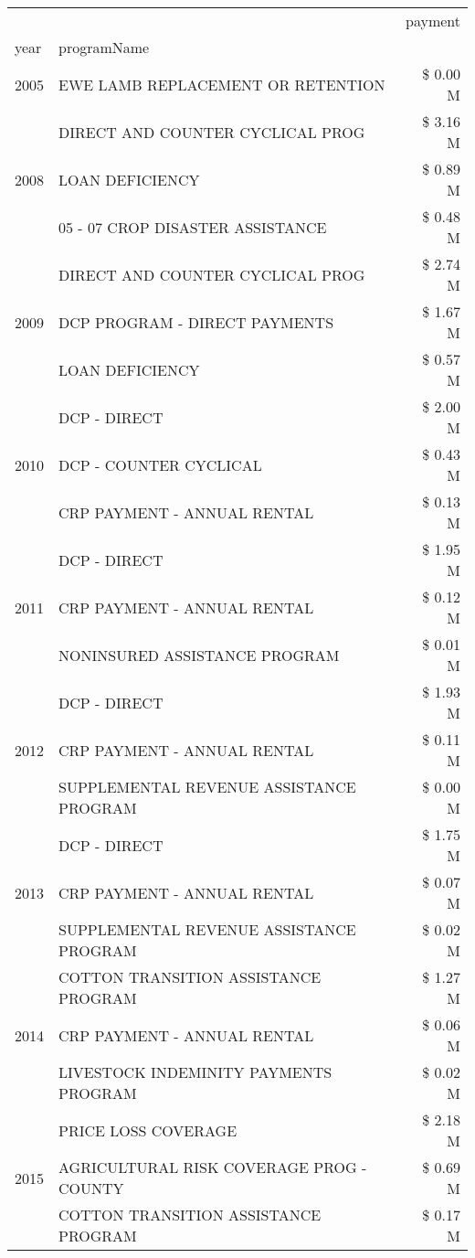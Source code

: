 \begin{tabular}{llr}
\toprule
 &  & payment \\
year & programName &  \\
\midrule
2005 & EWE LAMB REPLACEMENT OR RETENTION & \$ 0.00 M \\
\cline{1-3}
\multirow[t]{3}{*}{2008} & DIRECT AND COUNTER CYCLICAL PROG & \$ 3.16 M \\
 & LOAN DEFICIENCY & \$ 0.89 M \\
 & 05 - 07 CROP DISASTER ASSISTANCE & \$ 0.48 M \\
\cline{1-3}
\multirow[t]{3}{*}{2009} & DIRECT AND COUNTER CYCLICAL PROG & \$ 2.74 M \\
 & DCP PROGRAM - DIRECT PAYMENTS & \$ 1.67 M \\
 & LOAN DEFICIENCY & \$ 0.57 M \\
\cline{1-3}
\multirow[t]{3}{*}{2010} & DCP - DIRECT & \$ 2.00 M \\
 & DCP - COUNTER CYCLICAL & \$ 0.43 M \\
 & CRP PAYMENT - ANNUAL RENTAL & \$ 0.13 M \\
\cline{1-3}
\multirow[t]{3}{*}{2011} & DCP - DIRECT & \$ 1.95 M \\
 & CRP PAYMENT - ANNUAL RENTAL & \$ 0.12 M \\
 & NONINSURED ASSISTANCE PROGRAM & \$ 0.01 M \\
\cline{1-3}
\multirow[t]{3}{*}{2012} & DCP - DIRECT & \$ 1.93 M \\
 & CRP PAYMENT - ANNUAL RENTAL & \$ 0.11 M \\
 & SUPPLEMENTAL REVENUE ASSISTANCE PROGRAM & \$ 0.00 M \\
\cline{1-3}
\multirow[t]{3}{*}{2013} & DCP - DIRECT & \$ 1.75 M \\
 & CRP PAYMENT - ANNUAL RENTAL & \$ 0.07 M \\
 & SUPPLEMENTAL REVENUE ASSISTANCE PROGRAM & \$ 0.02 M \\
\cline{1-3}
\multirow[t]{3}{*}{2014} & COTTON TRANSITION ASSISTANCE PROGRAM & \$ 1.27 M \\
 & CRP PAYMENT - ANNUAL RENTAL & \$ 0.06 M \\
 & LIVESTOCK INDEMINITY PAYMENTS PROGRAM & \$ 0.02 M \\
\cline{1-3}
\multirow[t]{3}{*}{2015} & PRICE LOSS COVERAGE & \$ 2.18 M \\
 & AGRICULTURAL RISK COVERAGE PROG - COUNTY & \$ 0.69 M \\
 & COTTON TRANSITION ASSISTANCE PROGRAM & \$ 0.17 M \\

\end{tabular}
